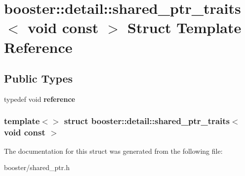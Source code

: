 \section{booster\-:\-:detail\-:\-:shared\-\_\-ptr\-\_\-traits$<$ void const $>$ \-Struct \-Template \-Reference}
\label{structbooster_1_1detail_1_1shared__ptr__traits_3_01void_01const_01_01_4}
\subsection*{\-Public \-Types}
\begin{DoxyCompactItemize}
\item 
typedef void {\bfseries reference}\label{structbooster_1_1detail_1_1shared__ptr__traits_3_01void_01const_01_01_4_a1ff49086832d34498d61f5962b7f4eea}

\end{DoxyCompactItemize}
\subsubsection*{template$<$$>$ struct booster\-::detail\-::shared\-\_\-ptr\-\_\-traits$<$ void const  $>$}



\-The documentation for this struct was generated from the following file\-:\begin{DoxyCompactItemize}
\item 
booster/shared\-\_\-ptr.\-h\end{DoxyCompactItemize}
